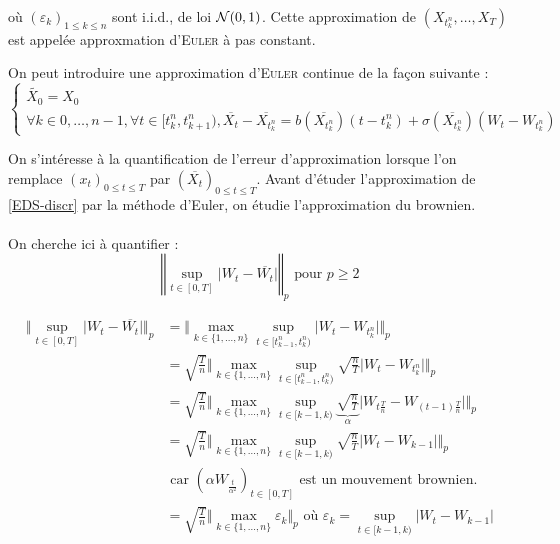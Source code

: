   où $\left(\varepsilon_k\right)_{1 \leq k \leq n}$ sont i.i.d., de loi $\mathcal{N}(0,1)$.
  Cette approximation de $(X_{t_k^n},\ldots,X_T)$ est appelée approxmation d'\textsc{Euler} à pas constant.

  On peut introduire une approximation d'\textsc{Euler} continue de la façon suivante :
  \[
    \begin{cases}
      \widetilde{X_0} = X_0 \\
      \forall k \in {0, \ldots, n-1}, \forall t \in [t_k^n, t_{k+1}^n), \overline{X_t} - \overline{X_{t_k^n}} = b(\overline{X_{t_k^n}}) (t-t_k^n) + \sigma(\overline{X_{t_k^n}})(W_t - W_{t_k^n})
    \end{cases}
  \]

  On s'intéresse à la quantification de l'erreur d'approximation lorsque l'on remplace $(x_t)_{0 \leq t \leq T}$ par $(\overline{X_t})_{0 \leq t \leq T}$. Avant d'étuder l'approximation de \eqref{EDS-discr} par la méthode d'Euler, on étudie l'approximation du brownien. \\

 \\
On cherche ici à quantifier :
\[ \left\Vert \sup_{t \in [0,T]} \vert W_t - \overline{W_t} \vert \right\Vert_p \text{ pour } p \geq 2 \]

\newcommand{\maxn}{\max_{k\in\{1,\ldots,n\} } }
\newcommand{\supt}{\sup_{t \in [t_{k-1}^n, t_k^n)} }
\renewcommand{\wtk}{W_{t_k^n}}
\begin{equation*}
\begin{split}
  \Vert \sup_{t \in [0,T]} \vert W_t - \overline{W_t} \vert \Vert_p &= \Vert \maxn \supt \vert W_t - \wtk \vert \Vert_p  \\
  &= \sqrt{\frac{T}{n}} \Vert \maxn \supt \sqrt{\frac{n}{T}} \vert W_t - \wtk \vert \Vert_p  \\
  &= \sqrt{\frac{T}{n}} \Vert \maxn \sup_{t \in [k-1, k)} \underbrace{\sqrt{\frac{n}{T}}}_\alpha \vert W_{t {\frac{T}{n}}} - W_{(t-1) \frac{T}{n}} \vert \Vert_p \\
  &= \sqrt{\frac{T}{n}} \Vert \maxn \sup_{t \in [k-1, k)} \sqrt{\frac{n}{T}} \vert W_t - W_{k-1} \vert \Vert_p \\
  &\text{ car $(\alpha W_{ \frac{t}{\alpha^2}})_{t \in [0,T]}$ est un mouvement brownien. } \\
  &= \sqrt{ \frac{T}{n} } \Vert \max_{k \in \{ 1, \ldots, n \}} \varepsilon_k \Vert_p \text{ où } \varepsilon_k = \sup_{t \in [k-1, k)} \vert W_t - W_{k-1} \vert
\end{split}
\end{equation*}

